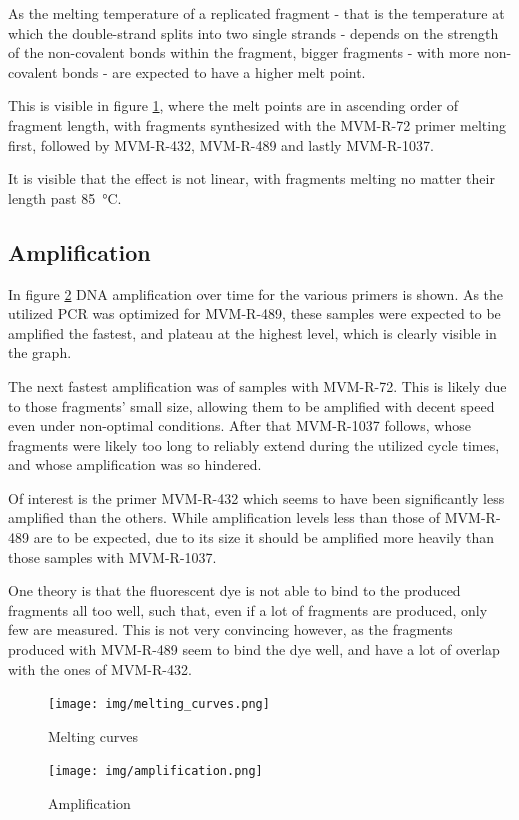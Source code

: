 \documentclass[a4paper,english]{scrreprt}
\begin{document}
As the melting temperature of a replicated fragment - that is the temperature
at which the double-strand splits into two single strands - depends on the
strength of the non-covalent bonds within the fragment, bigger fragments - with
more non-covalent bonds - are expected to have a higher melt point.

This is visible in figure \ref{fig:melting_curves}, where the melt points are
in ascending order of fragment length, with fragments synthesized with the
MVM-R-72 primer melting first, followed by MVM-R-432, MVM-R-489 and lastly
MVM-R-1037.

It is visible that the effect is not linear, with fragments melting no matter
their length past \SI{85}{\celsius}.

\subsection{Amplification}

In figure \ref{fig:amplification} DNA amplification over time for the various
primers is shown. As the utilized PCR was optimized for MVM-R-489, these
samples were expected to be amplified the fastest, and plateau at the highest
level, which is clearly visible in the graph.

The next fastest amplification was of samples with MVM-R-72. This is likely due
to those fragments' small size, allowing them to be amplified with decent speed
even under non-optimal conditions. After that MVM-R-1037 follows, whose
fragments were likely too long to reliably extend during the utilized cycle
times, and whose amplification was so hindered.

Of interest is the primer MVM-R-432 which seems to have been significantly less
amplified than the others. While amplification levels less than those of
MVM-R-489 are to be expected, due to its size it should be amplified more
heavily than those samples with MVM-R-1037.

One theory is that the fluorescent dye is not able to bind to the produced
fragments all too well, such that, even if a lot of fragments are produced,
only few are measured. This is not very convincing however, as the fragments
produced with MVM-R-489 seem to bind the dye well, and have a lot of overlap
with the ones of MVM-R-432.

\begin{figure}
	\centering
	\texttt{[image: img/melting\_curves.png]}
	\caption{Melting curves}
	\label{fig:melting_curves}
\end{figure}

\begin{figure}
	\centering
	\texttt{[image: img/amplification.png]}
	\caption{Amplification}
	\label{fig:amplification}
\end{figure}




\end{document}
